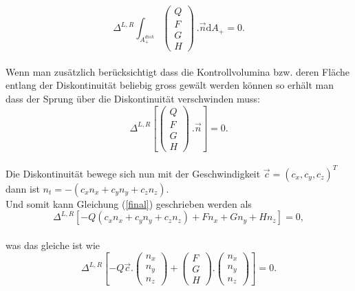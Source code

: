 \begin{equation}
\Delta^{L,R} \int_{A_+^{disk}}^{} \!   \left(
 \begin{array}{ccc}
Q \\ F \\ G \\ H
\end{array} \right)\ . \overrightarrow{n} \mathrm{d} A_+ =0.
\end{equation}\\
Wenn man zus\"atzlich ber\"ucksichtigt dass die Kontrollvolumina bzw. deren Fl\"ache entlang der Diskontinuit\"at beliebig gross gew\"alt werden k\"onnen so erh\"alt man dass der Sprung \"uber die Diskontinuit\"at verschwinden muss:\\
\begin{equation}
\Delta^{L,R} \left[ \left(
 \begin{array}{ccc}
Q \\ F \\ G \\ H
\end{array} \right)\ . \overrightarrow{n} \right] =0.
\label{final}
\end{equation}\\
Die Diskontinuit\"at bewege sich nun mit der Geschwindigkeit $\overrightarrow{c}=\left(c_x,c_y,c_z\right)^T$ dann ist $n_t=-\left(c_x n_x+c_y n_y+c_z n_z\right)$.\\
Und somit kann Gleichung (\ref{final}) geschrieben werden als\\
\begin{equation}
\Delta^{L,R} \left[-Q\left(c_x n_x+c_y n_y+c_z n_z\right) +F n_x+G n_y+H n_z\right] =0,
\end{equation}\\
was das gleiche ist wie\\
\begin{equation}
\Delta^{L,R} \left[ -Q \overrightarrow{c} .
\left( \begin{array}{ccc}
n_x \\ n_y \\ n_z
\end{array} \right)+ \left(
\begin{array}{ccc}
F \\ G \\ H
\end{array} \right).
\left( \begin{array}{ccc}
n_x \\ n_y \\ n_z
\end{array} \right) \right] = 0.
\end{equation}\\
